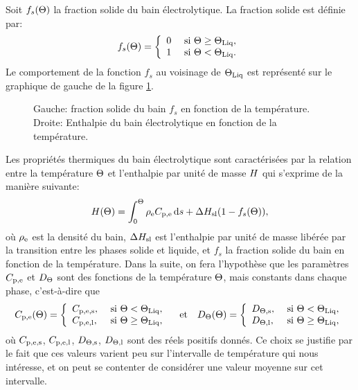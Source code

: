 Soit $f_s(\Theta)$ la fraction solide du bain électrolytique. La
fraction solide est définie par:
\begin{equation}
  f_s(\Theta) = \left\{
  \begin{array}{ll}
    0           & \text{ si } \Theta \geq \Theta_\text{Liq},\\
    1           & \text{ si } \Theta < \Theta_\text{Liq}.
  \end{array}
  \right.
\end{equation}
Le comportement de la fonction $f_s$ au voisinage de $\Theta_\text{Liq}$ est
représenté sur le graphique de gauche de la figure
\ref{fig:solid-fraction-enthalpy}.

\begin{figure}
  \begin{center}
    
    
    \caption{Gauche: fraction solide du bain $f_s$ en fonction de la
      température. Droite: Enthalpie du bain électrolytique en
      fonction de la température.}
    \label{fig:solid-fraction-enthalpy}
  \end{center}
\end{figure}

Les propriétés thermiques du bain électrolytique sont
caractérisées par la relation entre la température $\Theta$ et
l'enthalpie par unité de masse $H$ qui s'exprime de la manière
suivante:
\begin{equation}
  \enthalpy(\temperature) = %
    \int_0^\temperature
      \electrolytedensity\electrolytehc\intd{s} %
    + \fusionenthalpy(1 - f_s(\temperature)),
\end{equation}
où $\rho_\mathrm{e}$ est la densité du bain, $\Delta H_\mathrm{sl}$ est
l'enthalpie par unité de masse libérée par la transition entre les
phases solide et liquide, et $f_s$ la fraction solide du bain en
fonction de la température. Dans la suite, on fera l'hypothèse que les
paramètres $C_{\mathrm{p,e}}$ et $D_\Theta$ sont des fonctions
de la température $\Theta$, mais constants dans chaque phase,
c'est-à-dire que
\begin{equation}
  C_{\mathrm{p,e}}(\Theta) = \left\{
  \begin{array}{ll}
    C_{\mathrm{p,e,s}}, & \text{ si } \Theta < \Theta_\text{Liq},\\
    C_{\mathrm{p,e,l}}, & \text{ si } \Theta \geq \Theta_\text{Liq},
  \end{array}
  \right.
  \quad\text{et}\quad
  D_\Theta(\Theta) = \left\{
  \begin{array}{ll}
    D_{\Theta,\mathrm{s}}, & \text{ si } \Theta < \Theta_\text{Liq},\\
    D_{\Theta,\mathrm{l}}, & \text{ si } \Theta \geq \Theta_\text{Liq},
  \end{array}
  \right.
\end{equation}
où $C_{\mathrm{p,e,s}}$, $C_{\mathrm{p,e,l}}$, $D_{\Theta,\mathrm{s}}$,
$D_{\Theta,\mathrm{l}}$ sont des réels positifs donnés.
Ce choix se justifie par le fait que ces valeurs
varient peu sur l'intervalle de température qui nous intéresse, et
on peut se contenter de considérer une valeur moyenne sur cet intervalle.

